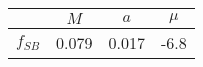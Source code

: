 \begin{tabular}{c||c|c|c}
 & $M$ & $a$ & $\mu$  \\
\hline
$f_{SB}$  & 0.079 & 0.017 & -6.8\\
\end{tabular}
